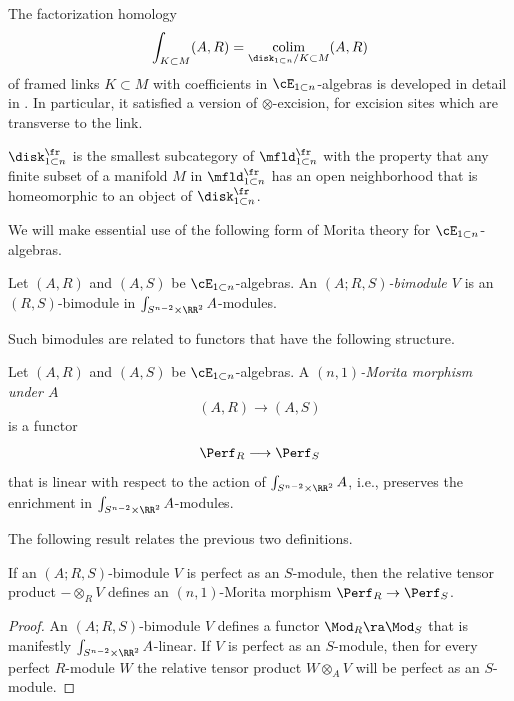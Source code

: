 \documentclass[10pt]{amsart}
\begin{document}
The factorization homology
\[
\int_{K\subset M}(A,R) = \underset{\disk_{1\subset n}/K\subset M}{\rm colim} (A,R)
\]
of framed links $K\subset M$ with coefficients in $\cE_{1\subset n}$-algebras is developed in detail in \cite{AFT2}. In particular, it satisfied a version of $\otimes$-excision, for excision sites which are transverse to the link.


\begin{rmk} 
$\disk^{\fr}_{1\subset n}$ is the smallest subcategory of $\mfld^{\fr}_{1\subset n}$ with the property that any finite subset of a manifold $M$ in $\mfld^{\fr}_{1\subset n}$ has an open neighborhood that is homeomorphic to an object of $\disk^{\fr}_{1\subset n}$.
\end{rmk}


We will make essential use of the following form of Morita theory for $\cE_{1\subset n}$-algebras.



\begin{dfn}
Let $(A,R)$ and $(A,S)$ be $\cE_{1\subset n}$-algebras. 
An {\em $(A; R,S)$-bimodule $V$} is an $(R,S)$-bimodule in $\int_{S^{n-2}\times\RR^2}A$-modules.    
\end{dfn}

Such bimodules are related to functors that have the following structure.

\begin{dfn}
Let $(A,R)$ and $(A,S)$ be $\cE_{1\subset n}$-algebras. 
A {\em $(n,1)$-Morita morphism under $A$}
\[
(A,R) \to (A,S)
\]
is a functor
\[
\Perf_R \longrightarrow \Perf_S
\]
that is linear with respect to the action of $\int_{S^{n-2}\times \RR^2}A$, i.e., preserves the enrichment in $\int_{S^{n-2}\times \RR^2}A$-modules.
\end{dfn}

The following result relates the previous two definitions.

\begin{lmm}
\label{lmm: perfect is n1 morita}
If an $(A; R, S)$-bimodule $V$ is perfect as an $S$-module, 
then the relative tensor product $-\otimes_R V$ defines an $(n,1)$-Morita morphism $\Perf_R\to \Perf_S$.
\end{lmm}

\begin{proof}
An $(A; R, S)$-bimodule $V$ defines a functor $\Mod_R\ra \Mod_S$ that is manifestly $\int_{S^{n-2}\times\RR^2}A$-linear. 
If $V$ is perfect as an $S$-module, then for every perfect $R$-module $W$ the relative tensor product $W\otimes_A V$ will be perfect as an $S$-module.    
\end{proof}
\end{document}
